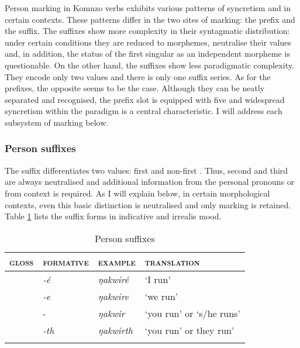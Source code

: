 Person marking in Komnzo verbs exhibits various patterns of syncretism and  in certain contexts. These patterns differ in the two sites of  marking: the prefix and the suffix. The suffixes show more complexity in their syntagmatic distribution: under certain conditions they are reduced to  morphemes, neutralise their  values and, in addition, the status of the first singular as an independent morpheme is questionable. On the other hand, the suffixes show less paradigmatic complexity. They encode only two  values and there is only one suffix series. As for the prefixes, the opposite seems to be the case. Although they can be neatly separated and recognised, the prefix slot is equipped with five  and widespread syncretism within the paradigm is a central characteristic. I will address each subsystem of  marking below.

\subsubsection{Person suffixes} \label{personsuffsection}

The  suffix differentiates two  values: first and non-first . Thus, second and third  are always neutralised and additional information from the personal pronouns or from context is required. As I will explain below, in certain morphological contexts, even this basic distinction is neutralised and only  marking is retained. Table \ref{perssuff} lists the suffix forms in indicative and irrealis mood.

\begin{table}[H]
\caption{Person suffixes}
\label{perssuff}
	\begin{tabular}{llll}
		\lsptoprule
		\textsc{gloss} & \textsc{formative} & \textsc{example} &\textsc{translation}\\\hline
		\Fsg &\emph{-é} &\emph{ŋakwiré}	&`I run'\\
		\Fnsg &\emph{-e} &\emph{ŋakwire} &`we run'\\
		\Stsg &-\Zero &\emph{ŋakwir} &`you run' or `s/he runs'\\
		\Stnsg &\emph{-th} &\emph{ŋakwirth}	&`you run' or they run'\\
		\lspbottomrule
	\end{tabular}
\end{table}%

